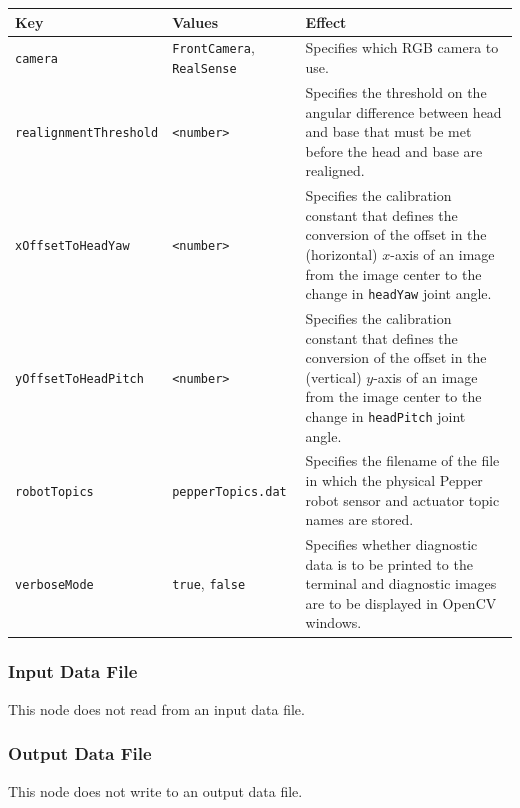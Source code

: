 \documentclass{CSSRforAfrica}
\begin{document}
{{\begin{center}
\begin{tabularx}{\linewidth}{| l | l | X|}
\hline 
{\small Key }                               & {\small Values }                                                 &  {\small Effect}       \\
\hline
{\footnotesize \verb+camera+ }  & {\footnotesize \verb+FrontCamera+, \verb+RealSense+}     & {\small Specifies which RGB camera to use.} \\ 
\hline
{\footnotesize \verb+realignmentThreshold+ }  & {\footnotesize \verb+<number>+}     & {\small Specifies the threshold on the angular difference between head and base that must be met before the head and base are realigned.} \\
\hline
{\footnotesize \verb+xOffsetToHeadYaw+ }  & {\footnotesize \verb+<number>+}     & {\small Specifies the calibration constant that defines the conversion of the offset in the (horizontal)  $x$-axis of an image from the image center to the change in {\small \verb+headYaw+} joint angle.} \\
\hline
{\footnotesize \verb+yOffsetToHeadPitch+ }  & {\footnotesize \verb+<number>+}     & {\small Specifies the calibration constant that defines the conversion of the offset in the  (vertical) $y$-axis of an image from the image center to the change in {\small \verb+headPitch+} joint angle.} \\
\hline
{\footnotesize \verb+robotTopics+ }  & {\footnotesize \verb+pepperTopics.dat+}     & {\small Specifies the filename of the file in which the physical Pepper robot sensor and actuator topic names are stored.} \\
\hline
{\footnotesize \verb+verboseMode+}  & {\footnotesize \verb+true+, \verb+false+}     & {\small Specifies whether diagnostic data is to be printed to the terminal and diagnostic images are to be displayed in OpenCV windows.} \\
\hline
\end{tabularx}
\end{center}

\subsubsection*{Input Data File}
This node does not read from an input data file.


\subsubsection*{Output Data File}
This node does not write to an output data file.

}}
\end{document}
